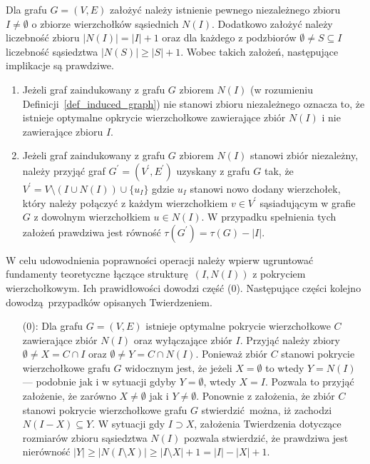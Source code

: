 \par{
  \begin{theorem}
    Dla grafu $G=(V,E)$ założyć należy istnienie pewnego niezależnego zbioru $I\neq \emptyset$ o zbiorze wierzchołków sąsiednich $N(I)$.
    Dodatkowo założyć należy liczebność zbioru $|N(I)|=|I| + 1$ oraz dla każdego z podzbiorów $\emptyset \neq S \subseteq I$ liczebność sąsiedztwa $|N(S)| \geq |S| + 1$.
    Wobec takich założeń, następujące implikacje są prawdziwe.
    \begin{enumerate}
      \item Jeżeli graf zaindukowany z grafu $G$ zbiorem $N(I)$ (w rozumieniu Definicji~\ref{def_induced_graph}) nie stanowi zbioru niezależnego oznacza to, że istnieje optymalne opkrycie wierzchołkowe zawierające zbiór $N(I)$ i nie zawierające zbioru $I$.
      \item Jeżeli graf zaindukowany z grafu $G$ zbiorem $N(I)$ stanowi zbiór niezależny, należy przyjąć graf $G^\prime=(V^\prime, E^\prime)$ uzyskany z grafu $G$ tak, że $V^\prime=V \setminus (I \cup N(I)) \cup \{u_I\}$ gdzie $u_I$ stanowi nowo dodany wierzchołek, który należy połączyć z każdym wierzchołkiem $v \in V^\prime$ sąsiadującym w grafie $G$ z dowolnym wierzchołkiem $u \in N(I)$.
      W przypadku spełnienia tych założeń prawdziwa jest równość $\tau(G^\prime)=\tau(G)-|I|$.
    \end{enumerate}
  \end{theorem}
  \begin{bproof} W celu udowodnienia poprawności operacji należy wpierw ugruntować fundamenty teoretyczne łączące strukturę $(I, N(I))$ z pokryciem wierzchołkowym. Ich prawidłowości dowodzi część (0).
    Następujące części kolejno dowodzą przypadków opisanych Twierdzeniem.
    \begin{itemize}
      \item[(0):] Dla grafu $G=(V, E)$ istnieje optymalne pokrycie wierzchołkowe $C$ zawierające zbiór $N(I)$ oraz wyłączające zbiór $I$.
      Przyjąć należy zbiory $\emptyset \neq X=C \cap I$ oraz $\emptyset \neq Y=C \cap N(I)$.
      Ponieważ zbiór $C$ stanowi pokrycie wierzchołkowe grafu $G$ widocznym jest, że jeżeli $X=\emptyset$ to wtedy $Y=N(I)$ --- podobnie jak i w sytuacji gdyby $Y=\emptyset$, wtedy $X=I$.
      Pozwala to przyjąć założenie, że zarówno $X\neq \emptyset$ jak i $Y\neq \emptyset$.
      Ponownie z założenia, że zbiór $C$ stanowi pokrycie wierzchołkowe grafu $G$ stwierdzić można, iż zachodzi $N(I-X)\subseteq Y$.
      W sytuacji gdy $I \supset X$, założenia Twierdzenia dotyczące rozmiarów zbioru sąsiedztwa $N(I)$ pozwala stwierdzić, że prawdziwa jest nierówność $|Y| \geq |N(I \setminus X)| \geq |I \setminus X| + 1 = |I| - |X| + 1$.

\end{itemize}
\end{bproof}}
